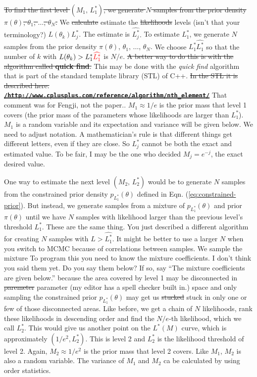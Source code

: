 \documentclass[letterpaper, preprint]{aastex}
\newcommand{\qer}[1]{{\color{red}#1}}
\begin{document}
\sout{To find the first level $\left(M_1, \,L^*_1\right)$, we generate $N$ samples from the 
prior density 
$\pi(\theta)$, $\theta_1$, $\ldots$, $\theta_N$.} We \sout{calculate} \qer{estimate} the \sout{likelihoods} 
\qer{levels (isn't that your terminology?)} \sout{$L(\theta_k)$}\qer{$L^*_j$.
The estimate is $\widehat{L^*_j}$}.
\qer{To estimate $L^*_1$, we generate $N$ samples from the prior density 
$\pi(\theta)$, $\theta_1$, $\ldots$, $\theta_N$.}
We choose \sout{$L^*_1$}\qer{$\widehat{L^*_1}$} so that the number of $k$ with 
$L(\theta_k) > L^*_1\qer{\widehat{L^*_1}}$ is $N/e$. 
\sout{A better way to do this is with the algorithm called {\bf quick find}. }
\qer{This may be done with the {\em quick find} algorithm that is part of the standard template
library (STL) of C++.}
\sout{In the STL it is described here: \href{http://www.cplusplus.com/reference/algorithm/nth_element/}
{\color{blue} \bf \tt /http://www.cplusplus.com/reference/algorithm/nth\_element/}}
\qer{That comment was for Fengji, not the paper.}. 
$M_1\approx1/e$ is the prior mass that level 1 covers (the prior mass of the parameters whose likelihoods are larger than $L_1^*$). $M_1$ is a random variable and its expectation and variance will be given below. 
\qer{We need to adjust notation.
A mathematician's rule is that different things get different letters, even if they are close.
So $L^*_j$ cannot be both the exact and estimated value.
To be fair, I may be the one who decided $M_j = e^{-j}$, the exact desired value.}

One way to estimate the next level $\left(M_2, \,L^*_2\right)$ would be to generate $N$ samples from  the constrained prior density $p_{L_1^*}(\theta)$ defined in Eqn. (\ref{eq:constrained-prior}). But instead, we generate samples from a mixture of $p_{L_1^*}(\theta)$ and prior $\pi(\theta)$ until we have $N$ samples with likelihood larger than  the previous level's threshold $L_1^*$. 
\qer{These are the same thing.
You just described a different algorithm for creating $N$ samples with $L>\widehat{L^*_1}$.
It might be better to use a larger $N$ when you switch to MCMC because of correlations between samples.}
We sample the mixture \qer{To program this you need to know the mixture coefficients.
I don't think you said them yet.
Do you say them below?  If so, say ``The mixture coefficients are given below.''}
because the area covered by level 1 may be disconnected in \sout{paremeter} 
\qer{parameter (my editor has a spell checker built in.)} space and only sampling the constrained prior $p_{L_1^*}(\theta)$ may get us \sout{stucked} \qer{stuck} in only one or few of those disconnected areas. Like before, we get a chain of $N$ likelihoods, rank these likelihoods in descending order and find the $N/e$-th likelihood, which we call $L_2^*$. This would give us another point on the $L^*(M)$ curve, which is approximately $(1/e^2,L_2^*)$. This is level 2 and $L_2^*$ is the likelihood threshold of level 2. Again, $M_2\approx1/e^2$ is the prior mass that level 2 covers. Like $M_1$, $M_2$ is also a random variable. The variance of $M_1$ and $M_2$ ca be calculated by using order statistics.
\end{document}
